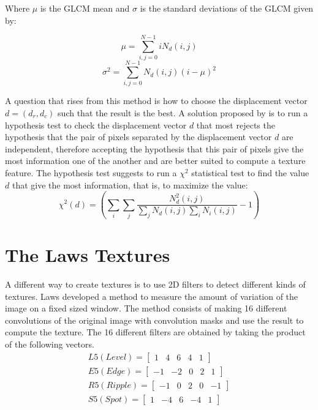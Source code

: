 Where $\mu$ is the GLCM mean and $\sigma$ is the standard deviations of the GLCM given by:

\begin{equation}
    \mu=\sum_{i,j=0}^{N-1}iN_d(i,j)
\end{equation}
\begin{equation}
    \sigma^2=\sum_{i,j=0}^{N-1}N_d(i,j)(i-\mu)^2
\end{equation}

A question that rises from this method is how to choose the displacement vector $d=(d_r,d_c)$ such that the result is the best. A solution proposed by  \cite{Zucker} is to run a hypothesis test to check the displacement vector $d$ that most rejects the hypothesis that the pair of pixels separated by the displacement vector $d$ are independent, therefore accepting the hypothesis that this pair of pixels give the most information one of the another and are better suited to compute a texture feature.
The hypothesis test suggests  to run a $\chi^2$ statistical test to find the value $d$ that give the most information, that is, to maximize the value:
\begin{equation}
    \chi^2(d) = (\sum_i\sum_j \frac{N_d^2(i,j)}{\sum_jN_d(i,j)\sum_iN_i(i,j)} -1)
\end{equation}

\section{The Laws Textures}
\label{sec:Laws_Textures}

A different way to create textures is to use 2D filters to detect different kinds of textures. Laws developed a method to measure the amount of variation of the image on a fixed sized window. The method consists of making 16 different convolutions of the original image with convolution masks and use the result to compute the texture. The 16 different filters are obtained by taking the product of the following vectors.
\begin{align}
L5 (Level) = 
\begin{bmatrix}
1&4&6&4&1
\end{bmatrix}\\
E5 (Edge) = 
\begin{bmatrix}
-1&-2&0&2&1
\end{bmatrix}\\
R5 (Ripple) = 
\begin{bmatrix}
-1&0&2&0&-1
\end{bmatrix}\\
S5 (Spot) = 
\begin{bmatrix}
1&-4&6&-4&1
\end{bmatrix}
\end{align}


